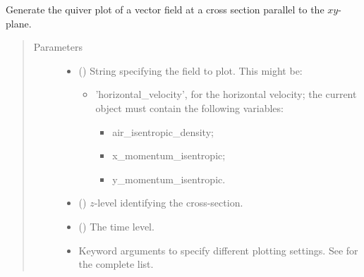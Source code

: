 \documentclass[letterpaper,10pt,english]{sphinxmanual}
\begin{document}
\begin{fulllineitems}
\begin{fulllineitems}
\end{fulllineitems}


\begin{fulllineitems}
\label{\detokenize{api:tasmania.storages.state_isentropic.StateIsentropic.quiver_xy}}
Generate the quiver plot of a vector field at a cross section parallel to the \(xy\)-plane.
\begin{quote}\begin{description}
\item[{Parameters}] \leavevmode\begin{itemize}
\item {} 
 () \textendash{} 
String specifying the field to plot. This might be:
\begin{itemize}
\item {} 
’horizontal\_velocity’, for the horizontal velocity; the current object must contain the                               following variables:
\begin{itemize}
\item {} 
air\_isentropic\_density;

\item {} 
x\_momentum\_isentropic;

\item {} 
y\_momentum\_isentropic.

\end{itemize}

\end{itemize}


\item {} 
 () \textendash{} \(z\)-level identifying the cross-section.

\item {} 
 () \textendash{} The time level.

\item {} 
 \textendash{} Keyword arguments to specify different plotting settings.
See {\hyperref[\detokenize{api:tasmania.utils.utils_plot.quiver_xy}]{}} for the complete list.


\end{itemize}
\end{description}
\end{quote}
\end{fulllineitems}
\end{fulllineitems}
\end{document}
